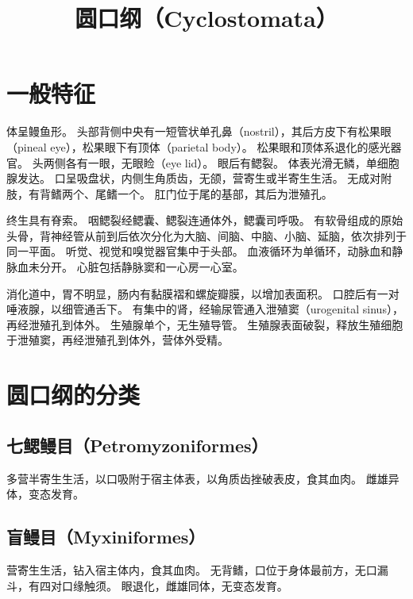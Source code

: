 \documentclass[11pt]{article}
\title{圆口纲（Cyclostomata）}
\date{}
\begin{document}
  \maketitle

  \linenumbers
  
\section{一般特征}
体呈鳗鱼形。
头部背侧中央有一短管状单孔鼻（nostril），其后方皮下有松果眼（pineal eye），松果眼下有顶体（parietal body）。
松果眼和顶体系退化的感光器官。
头两侧各有一眼，无眼睑（eye lid）。
眼后有鳃裂。
体表光滑无鳞，单细胞腺发达。
口呈吸盘状，内侧生角质齿，无颌，营寄生或半寄生生活。
无成对附肢，有背鳍两个、尾鳍一个。
肛门位于尾的基部，其后为泄殖孔。

\newline

终生具有脊索。
咽鳃裂经鳃囊、鳃裂连通体外，鳃囊司呼吸。
有软骨组成的原始头骨，背神经管从前到后依次分化为大脑、间脑、中脑、小脑、延脑，依次排列于同一平面。
听觉、视觉和嗅觉器官集中于头部。
血液循环为单循环，动脉血和静脉血未分开。
心脏包括静脉窦和一心房一心室。

\newline

消化道中，胃不明显，肠内有黏膜褶和螺旋瓣膜，以增加表面积。
口腔后有一对唾液腺，以细管通舌下。
有集中的肾，经输尿管通入泄殖窦（urogenital sinus），再经泄殖孔到体外。
生殖腺单个，无生殖导管。
生殖腺表面破裂，释放生殖细胞于泄殖窦，再经泄殖孔到体外，营体外受精。
  
\section{圆口纲的分类}
\subsection{七鳃鳗目（Petromyzoniformes）}
多营半寄生生活，以口吸附于宿主体表，以角质齿挫破表皮，食其血肉。
雌雄异体，变态发育。
  
\subsection{盲鳗目（Myxiniformes）}
营寄生生活，钻入宿主体内，食其血肉。
无背鳍，口位于身体最前方，无口漏斗，有四对口缘触须。
眼退化，雌雄同体，无变态发育。
  
\end{document}
